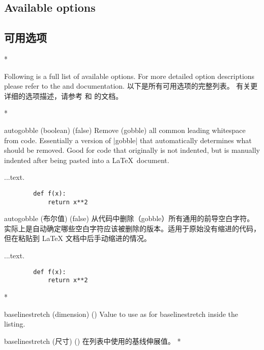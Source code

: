 % 
%  

\begin{paracol}{2}


\subsection{Available options}
\switchcolumn
\subsection{可用选项}
\switchcolumn[0]*%
\newcommand\appliesto[1]{\textsf{[For #1 only]}}
\newcommand\appliestoCn[1]{\textsf{[仅适用于 #1]}}

Following is a full list of available options.
For more detailed option descriptions please refer to the  and  documentation.
\switchcolumn
以下是所有可用选项的完整列表。
有关更详细的选项描述，请参考  和  的文档。

\begin{optionlist}
\switchcolumn[0]*%
\item[autogobble (boolean) (false)]
Remove (gobble) all common leading whitespace from code.  Essentially a version of |gobble| that automatically determines what should be removed.  Good for code that originally is not indented, but is manually indented after being pasted into a \LaTeX\ document.\\
\begin{example}
    ...text.
    \begin{verbatim}
        def f(x):
            return x**2
    \end{verbatim}
\end{example}
\switchcolumn
\item[autogobble (布尔值) (false)]
从代码中删除（gobble）所有通用的前导空白字符。实际上是自动确定哪些空白字符应该被删除的版本。适用于原始没有缩进的代码，但在粘贴到 \LaTeX{} 文档中后手动缩进的情况。\\
\begin{example}
    ...text.
    \begin{verbatim}
        def f(x):
            return x**2
    \end{verbatim}
\end{example}
\switchcolumn[0]*%
\item[baselinestretch (dimension) (\meta{document default})]
Value to use as for baselinestretch inside the listing.
\switchcolumn
\item[baselinestretch (尺寸) (\meta{文档默认值})]
在列表中使用的基线伸展值。
\switchcolumn[0]*%


\end{optionlist}
\end{paracol}
